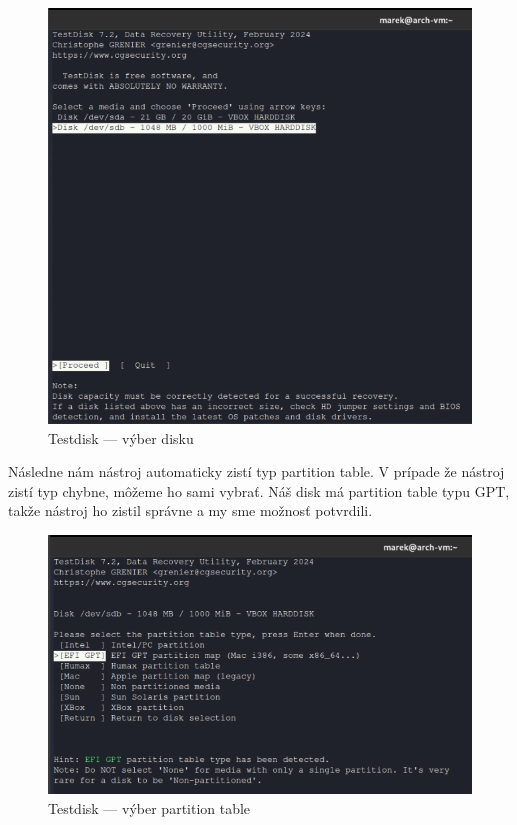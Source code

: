 \documentclass[12pt,oneside,slovak,a4paper]{article}
\begin{document}
\begin{figure}[H]
	\centering
	\includegraphics[scale=0.8]{./images/testdisk_testing/testdisk_choose_disk.png}
	\centering
	\captionsetup{justification=centering,margin=2cm}
	\caption{Testdisk --- výber disku}
\end{figure}

Následne nám nástroj automaticky zistí typ partition table. V prípade že nástroj zistí typ chybne, môžeme ho sami vybrať. Náš disk má partition table typu GPT, takže nástroj ho zistil správne a my sme možnosť potvrdili.

\begin{figure}[H]
	\centering
	\includegraphics[scale=0.8]{./images/testdisk_testing/choose_partition_table.png}
	\centering
	\captionsetup{justification=centering,margin=2cm}
	\caption{Testdisk --- výber partition table}
\end{figure}
\end{document}
